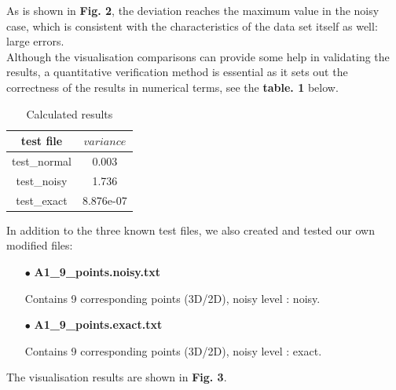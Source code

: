 \documentclass[a4paper]{article}
\begin{document}
As is shown in \textbf{Fig. 2}, the deviation reaches the maximum value in the noisy case, which is consistent with the characteristics of the data set itself as well: large errors.
~\\
Although the visualisation comparisons can provide some help in validating the results, a quantitative verification method is essential as it sets out the correctness of the results in numerical terms, see the \textbf{table. 1} below.

\begin{table}[h]\centering
\begin{tabular}{ |c|c| } 
 \hline
 test file & $variance$ \\ 
 \hline
 test\_normal & 0.003 \\ 
 \hline
 test\_noisy & 1.736 \\ 
 \hline
 test\_exact & 8.876e-07 \\ 
 \hline
\end{tabular}
\caption{Calculated results}
\end{table}

In addition to the three known test files, we also created and tested our own modified files:

\begin{itemize}

\item[$\bullet$] \textbf{A1\_9\_points.noisy.txt}

Contains 9 corresponding points (3D/2D), noisy level : noisy.

\item[$\bullet$] \textbf{A1\_9\_points.exact.txt}

Contains 9 corresponding points (3D/2D), noisy level : exact.

\end{itemize}

The visualisation results are shown in \textbf{Fig. 3}.
\end{document}
